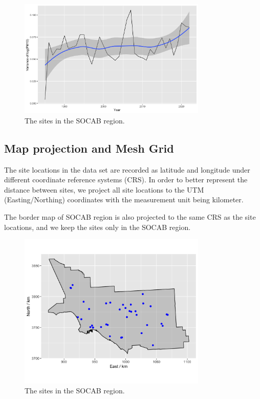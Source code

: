 \begin{figure}[ht]
	\centering
	\includegraphics[width = 0.8\textwidth]{socab_plots/logPM10_var.png}
	\caption{The sites in the SOCAB region.}
	\label{fig:logpm10_var}
\end{figure}

\subsection{Map projection and Mesh Grid}
The site locations in the data set are recorded as latitude and longitude under different coordinate
reference systems (CRS). In order to better represent the distance between sites, we project all 
site locations to the UTM (Easting/Northing) coordinates with the measurement unit being kilometer.

The border map of SOCAB region is also projected to the same CRS as the site locations, and we keep
the sites only in the SOCAB region. 

\begin{figure}[ht]
	\centering
	\includegraphics[width = 0.8\textwidth]{socab_plots/SOCAB_sites.png}
	\caption{The sites in the SOCAB region.}
	\label{fig:socab_sites}
\end{figure}

